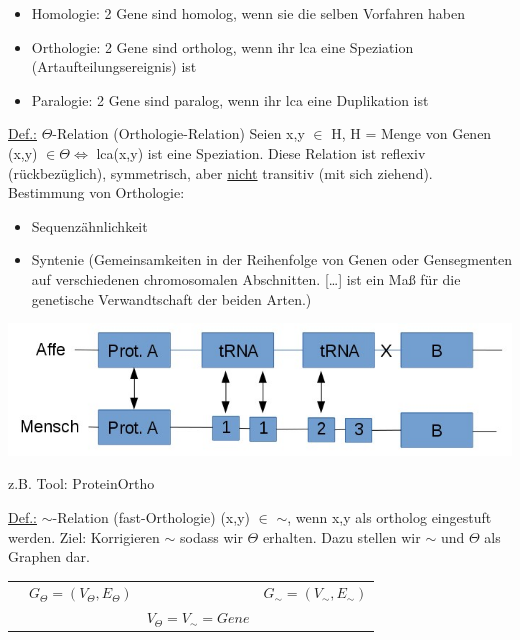 \begin{itemize}
	\item Homologie: 2 Gene sind homolog, wenn sie die selben Vorfahren haben
	\item Orthologie: 2 Gene sind ortholog, wenn ihr lca eine Speziation (Artaufteilungsereignis) ist
	\item Paralogie: 2 Gene sind paralog, wenn ihr lca eine Duplikation ist
\end{itemize}
\underline{Def.:} $\Theta$-Relation (Orthologie-Relation)
\newline
Seien x,y $\in$ H, H = Menge von Genen
\newline
(x,y) $\in \Theta \Leftrightarrow$ lca(x,y) ist eine Speziation.
\newline
Diese Relation ist reflexiv (rückbezüglich), symmetrisch, aber \underline{nicht} transitiv (mit sich ziehend).
\newline
Bestimmung von Orthologie:
\begin{itemize}
	\item Sequenzähnlichkeit
	\item Syntenie (\glqq Gemeinsamkeiten in der Reihenfolge von Genen oder Gensegmenten auf verschiedenen chromosomalen Abschnitten. […] ist ein Maß für die genetische Verwandtschaft der beiden Arten.\grqq [Wikipedia])
\end{itemize}
\begin{center}
	\includegraphics[scale=0.5]{lectures/161202/pix/02.jpg}
\end{center}
z.B. Tool: ProteinOrtho
\par\medskip
\underline{Def.:} $\sim$-Relation (fast-Orthologie)
\newline
(x,y) $\in$ $\sim$, wenn x,y als ortholog eingestuft werden.
\newline
Ziel: Korrigieren $\sim$ sodass wir $\Theta$ erhalten. Dazu stellen wir $\sim$ und $\Theta$ als Graphen dar.
\newline
\begin{tabular}{cccc}
	&$G_{\Theta} = (V_{\Theta} , E_{\Theta})$ & & $G_\sim = (V_\sim, E_\sim)$  \\
	& & $V_\Theta = V_\sim = Gene$ &
\end{tabular}
